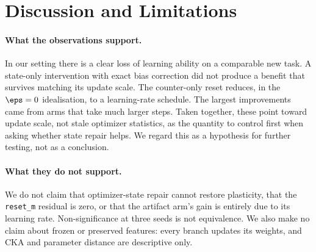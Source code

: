 \section{Discussion and Limitations}
\label{sec:discussion}

\paragraph{What the observations support.}
In our setting there is a clear loss of learning ability on a comparable new task. A state-only
intervention with exact bias correction did not produce a benefit that survives matching its update
scale. The counter-only reset reduces, in the $\eps=0$ idealisation, to a learning-rate schedule. The
largest improvements came from arms that take much larger steps. Taken together, these point toward
update scale, not stale optimizer statistics, as the quantity to control first when asking whether
state repair helps. We regard this as a hypothesis for further testing, not as a conclusion.

\paragraph{What they do not support.}
We do not claim that optimizer-state repair cannot restore plasticity, that the \texttt{reset\_m}
residual is zero, or that the artifact arm's gain is entirely due to its learning rate. Non-significance
at three seeds is not equivalence. We also make no claim about frozen or preserved features: every
branch updates its weights, and CKA and parameter distance are descriptive only.

